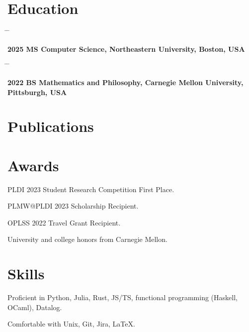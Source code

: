\documentclass[11pt]{article} %
\newcommand{\tabbedblock}[1]{
\begin{tabbing}
\hspace{2.5cm} \= \hspace{4cm} \= \kill
#1
\end{tabbing}
}
\begin{document}

\section{Education}

\tabbedblock{
\bf{2025} \>
\textbf{MS Computer Science}, Northeastern University, Boston, USA
}


\tabbedblock{
\bf{2022} \>
\textbf{BS Mathematics and Philosophy}, Carnegie Mellon University, Pittsburgh, USA
}

\section{Publications}

\printbibliography[heading=none]


\section{Awards}

PLDI 2023 Student Research Competition First Place.

PLMW@PLDI 2023 Scholarship Recipient.

OPLSS 2022 Travel Grant Recipient.

University and college honors from Carnegie Mellon.


\section{Skills}

Proficient in
Python,
Julia,
Rust, JS/TS,
functional programming (Haskell, OCaml), Datalog.

Comfortable with Unix, Git, Jira, LaTeX.
\end{document}
